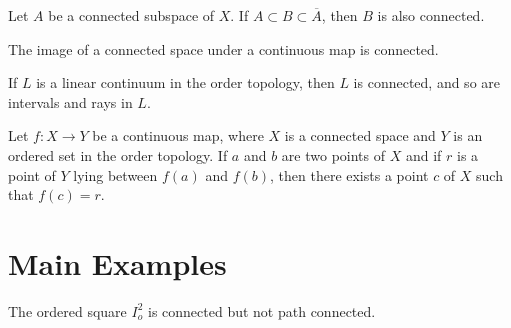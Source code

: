 \documentclass[11pt]{article}
\begin{document}
\begin{theorem}
Let $A$ be a connected subspace of $X$. If $A \subset B \subset \overline{A}$, then $B$ is also connected.
\end{theorem}

\begin{theorem}
The image of a connected space under a continuous map is connected.
\end{theorem}

\begin{theorem}
If $L$ is a linear continuum in the order topology, then $L$ is connected, and so are intervals and rays in $L$.
\end{theorem}

\begin{theorem}
Let $f \colon X \rightarrow Y$ be a continuous map, where $X$ is a connected space and $Y$ is an ordered set in the order topology. If $a$ and $b$ are two points of $X$ and if $r$ is a point of $Y$ lying between $f(a)$ and $f(b)$, then there exists a point $c$ of $X$ such that $f(c) = r$.
\end{theorem}

\newpage

\section{Main Examples}

\begin{eg}
The ordered square $I_o^2$ is connected but not path connected.
\end{eg}
\end{document}
